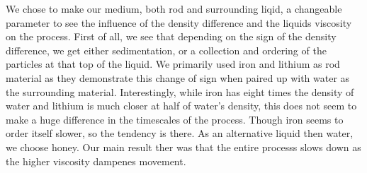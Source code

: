 
We chose to make our medium, both rod and surrounding liqid, a changeable parameter to see the influence of the density difference and the liquids viscosity on the process.
First of all, we see that depending on the sign of the density difference, we get either sedimentation, or a collection and ordering of the particles at that top of the liquid. We primarily used iron and lithium as rod material as they demonstrate this change of sign when paired up with water as the surrounding material. Interestingly, while iron has eight times the density of water and lithium is much closer at half of water's density, this does not seem to make a huge difference in the timescales of the process. Though iron seems to order itself slower, so the tendency is there.
As an alternative liquid then water, we choose honey. Our main result ther was that the entire processs slows down as the higher viscosity dampenes movement.
